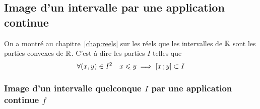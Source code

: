 \subsection{Image d'un intervalle par une application continue}

\begin{rappel}
  On a montré au chapitre~\ref{chap:reels} sur les réels que les intervalles de $\mathbb{R}$ sont les parties convexes de $\mathbb{R}$. C'est-à-dire les parties $I$ telles que
  \begin{equation}
    \forall (x,y) \in I^2 \quad x \leqslant y \implies \left[ x \, ;  y \right] \subset I
  \end{equation}
\end{rappel}

\subsubsection[Image continue d'un intervalle quelconque]{Image d'un intervalle quelconque $I$ par une application continue $f$}

